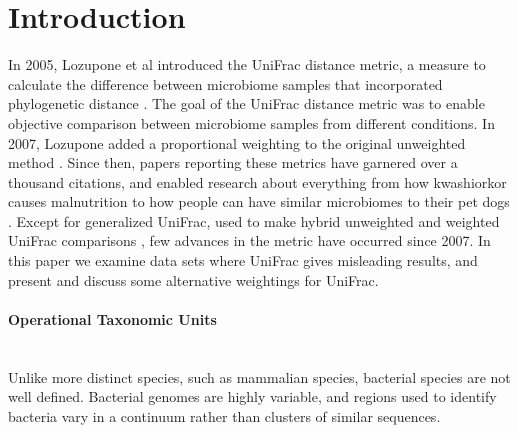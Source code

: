 \documentclass[10pt,letterpaper]{article}
\begin{document}

\linenumbers

\section*{Introduction}
In 2005, Lozupone et al introduced the UniFrac distance metric, a measure to calculate the difference between microbiome samples that incorporated phylogenetic distance \cite{lozupone2005unifrac}. The goal of the UniFrac distance metric was to enable objective comparison between microbiome samples from different conditions. In 2007, Lozupone added a proportional weighting to the original unweighted method \cite{lozupone2007quantitative}. Since then, papers reporting these metrics have garnered over a thousand citations, and enabled research about everything from how kwashiorkor causes malnutrition \cite{smith2013gut} to how people can have similar microbiomes to their pet dogs \cite{song2013cohabiting}. Except for generalized UniFrac, used to make hybrid unweighted and weighted UniFrac comparisons \cite{chen2012associating}, few advances in the metric have occurred since 2007. In this paper we examine data sets where UniFrac gives misleading results, and present and discuss some alternative weightings for UniFrac.

\paragraph{Operational Taxonomic Units}\mbox{}\\
Unlike more distinct species, such as mammalian species, bacterial species are not well defined. Bacterial genomes are highly variable, and regions used to identify bacteria vary in a continuum rather than clusters of similar sequences.
\end{document}
